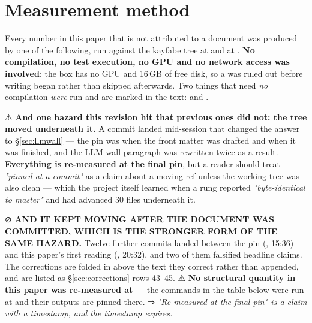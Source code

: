 \documentclass[10.5pt]{article}
\begin{document}
\appendix
\section{Measurement method}
\label{sec:method}

Every number in this paper that is not attributed to a document was produced by one of the
following, run against the kayfabe tree at  and
 at . \textbf{No compilation, no test
execution, no GPU and no network access was involved}: the box has no GPU and 16\,GB of free
disk, so a  was ruled out before writing began rather than skipped afterwards.
Two things that need \emph{no} compilation \emph{were} run and are marked \measured{} in the text:
 and .

\smallskip
⚠ \textbf{And one hazard this revision hit that previous ones did not: the tree moved underneath
it.} A commit landed mid-session that changed the answer to \S\ref{sec:llmwall} — the pin was
 when the front matter was drafted and  when it was finished, and
the LLM-wall paragraph was rewritten twice as a result. \textbf{Everything is re-measured at the
final pin}, but a reader should treat \emph{"pinned at a commit"} as a claim about a moving ref
unless the working tree was also clean — which the project itself learned when a rung reported
\emph{"byte-identical to master"} and  had advanced 30 files underneath it.

\smallskip
⊘ \textbf{AND IT KEPT MOVING AFTER THE DOCUMENT WAS COMMITTED, WHICH IS THE STRONGER FORM OF THE
SAME HAZARD.} Twelve further commits landed between the pin (, 15:36) and this
paper's first reading (, 20:32), and two of them falsified headline claims. The
corrections are folded in above the text they correct rather than appended, and are listed as
\S\ref{sec:corrections} rows 43--45. ⚠ \textbf{No structural quantity in this paper was
re-measured at } --- the commands in the table below were run at 
and their outputs are pinned there. ⇒ \emph{"Re-measured at the final pin" is a claim with a
timestamp, and the timestamp expires.}
\end{document}
